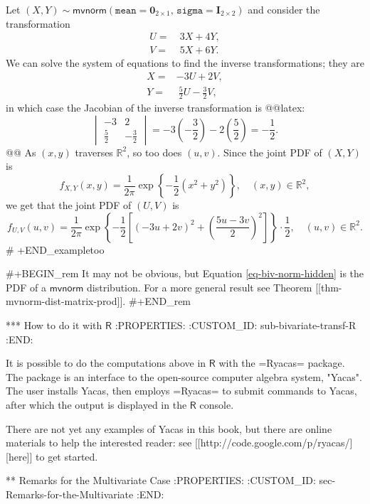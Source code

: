 Let
\((X,Y)\sim\mathsf{mvnorm}(\mathtt{mean}=\mathbf{0}_{2\times1},\,\mathtt{sigma}=\mathbf{I}_{2\times2})\)
and consider the transformation
\begin{align*}
U= & \ 3X+4Y,\\
V= & \ 5X+6Y.
\end{align*}
We can solve the system of equations to find the inverse
transformations; they are
\begin{align*}
X= & -3U+2V,\\
Y= & \ \frac{5}{2}U-\frac{3}{2}V,
\end{align*}
in which case the Jacobian of the inverse transformation is
@@latex:\[ \begin{vmatrix} -3 & 2\\ \frac{5}{2} & -\frac{3}{2} \end{vmatrix} = -3\left(-\frac{3}{2}\right)-2\left(\frac{5}{2}\right) = -\frac{1}{2}.\]@@
As \((x,y)\) traverses \(\mathbb{R}^{2}\), so too does \((u,v)\). Since the joint PDF of \((X,Y)\) is
\[
f_{X,Y}(x,y)=\frac{1}{2\pi}\exp\left\{ -\frac{1}{2}\left(x^{2}+y^{2}\right)\right\} ,\quad (x,y)\in\mathbb{R}^{2},
\]
we get that the joint PDF of \((U,V)\) is
\begin{equation}
\label{eq-biv-norm-hidden}
f_{U,V}(u,v)=\frac{1}{2\pi}\exp\left\{ -\frac{1}{2}\left[\left(-3u+2v\right)^{2}+\left(\frac{5u-3v}{2}\right)^{2}\right]\right\} \cdot\frac{1}{2},\quad (u,v)\in\mathbb{R}^{2}.
\end{equation}
# +END_exampletoo


#+BEGIN_rem
It may not be obvious, but Equation \eqref{eq-biv-norm-hidden} is the PDF of a
\(\mathsf{mvnorm}\) distribution. For a more general result see
Theorem [[thm-mvnorm-dist-matrix-prod]].
#+END_rem

*** How to do it with \(\mathsf{R}\)
:PROPERTIES:
:CUSTOM_ID: sub-bivariate-transf-R
:END:

It is possible to do the computations above in \(\mathsf{R}\) with the
=Ryacas= package. The package is an interface to the open-source
computer algebra system, "Yacas". The user installs Yacas, then
employs =Ryacas= to submit commands to Yacas, after which the output
is displayed in the \(\mathsf{R}\) console.

There are not yet any examples of Yacas in this book, but there are
online materials to help the interested reader: see [[http://code.google.com/p/ryacas/][here]] to get
started.

** Remarks for the Multivariate Case
:PROPERTIES:
:CUSTOM_ID: sec-Remarks-for-the-Multivariate
:END:

